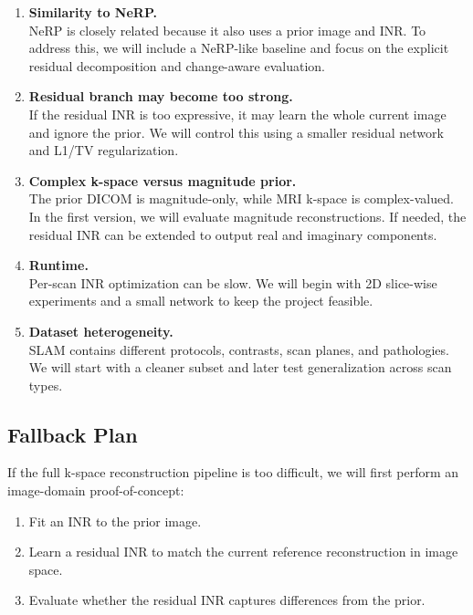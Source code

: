 \documentclass[11pt,a4paper]{article}
\begin{document}
\begin{enumerate}
    \item \textbf{Similarity to NeRP.} \\
    NeRP is closely related because it also uses a prior image and INR. To address this, we will include a NeRP-like baseline and focus on the explicit residual decomposition and change-aware evaluation.

    \item \textbf{Residual branch may become too strong.} \\
    If the residual INR is too expressive, it may learn the whole current image and ignore the prior. We will control this using a smaller residual network and L1/TV regularization.

    \item \textbf{Complex k-space versus magnitude prior.} \\
    The prior DICOM is magnitude-only, while MRI k-space is complex-valued. In the first version, we will evaluate magnitude reconstructions. If needed, the residual INR can be extended to output real and imaginary components.

    \item \textbf{Runtime.} \\
    Per-scan INR optimization can be slow. We will begin with 2D slice-wise experiments and a small network to keep the project feasible.

    \item \textbf{Dataset heterogeneity.} \\
    SLAM contains different protocols, contrasts, scan planes, and pathologies. We will start with a cleaner subset and later test generalization across scan types.
\end{enumerate}

\subsection{Fallback Plan}

If the full k-space reconstruction pipeline is too difficult, we will first perform an image-domain proof-of-concept:

\begin{enumerate}
    \item Fit an INR to the prior image.
    \item Learn a residual INR to match the current reference reconstruction in image space.
    \item Evaluate whether the residual INR captures differences from the prior.
\end{enumerate}
\end{document}
